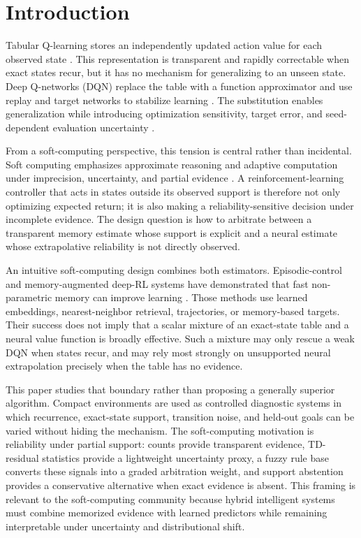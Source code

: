 \documentclass[preprint,12pt]{elsarticle}
\begin{document}
\section{Introduction}
\label{sec:introduction}

Tabular Q-learning stores an independently updated action value for each
observed state \cite{watkins1992qlearning}. This representation is transparent
and rapidly correctable when exact states recur, but it has no mechanism for
generalizing to an unseen state. Deep Q-networks (DQN) replace the table with a
function approximator and use replay and target networks to stabilize
learning \cite{mnih2015dqn,vanhasselt2016double}. The substitution enables
generalization while introducing optimization sensitivity, target error, and
seed-dependent evaluation uncertainty
\cite{henderson2018matters,agarwal2021precipice}.

From a soft-computing perspective, this tension is central rather than
incidental. Soft computing emphasizes approximate reasoning and adaptive
computation under imprecision, uncertainty, and partial evidence
\cite{zadeh1994soft}. A reinforcement-learning controller that acts in states
outside its observed support is therefore not only optimizing expected return;
it is also making a reliability-sensitive decision under incomplete evidence.
The design question is how to arbitrate between a transparent memory estimate
whose support is explicit and a neural estimate whose extrapolative reliability
is not directly observed.

An intuitive soft-computing design combines both estimators. Episodic-control and
memory-augmented deep-RL systems have demonstrated that fast non-parametric
memory can improve learning \cite{blundell2016model,pritzel2017nec,
lin2018emdqn,hansen2018fast,hu2021gem}. Those methods use learned embeddings,
nearest-neighbor retrieval, trajectories, or memory-based targets. Their
success does not imply that a scalar mixture of an exact-state table and a
neural value function is broadly effective. Such a mixture may only rescue a
weak DQN when states recur, and may rely most strongly on unsupported neural
extrapolation precisely when the table has no evidence.

This paper studies that boundary rather than proposing a generally superior
algorithm. Compact environments are used as controlled diagnostic systems in
which recurrence, exact-state support, transition noise, and held-out goals can
be varied without hiding the mechanism. The soft-computing motivation is
reliability under partial support: counts provide transparent evidence,
TD-residual statistics provide a lightweight uncertainty proxy, a fuzzy rule
base converts these signals into a graded arbitration weight, and support
abstention provides a conservative alternative when exact evidence is absent.
This framing is relevant to the soft-computing community because hybrid
intelligent systems must combine memorized evidence with learned predictors
while remaining interpretable under uncertainty and distributional shift.
\end{document}
